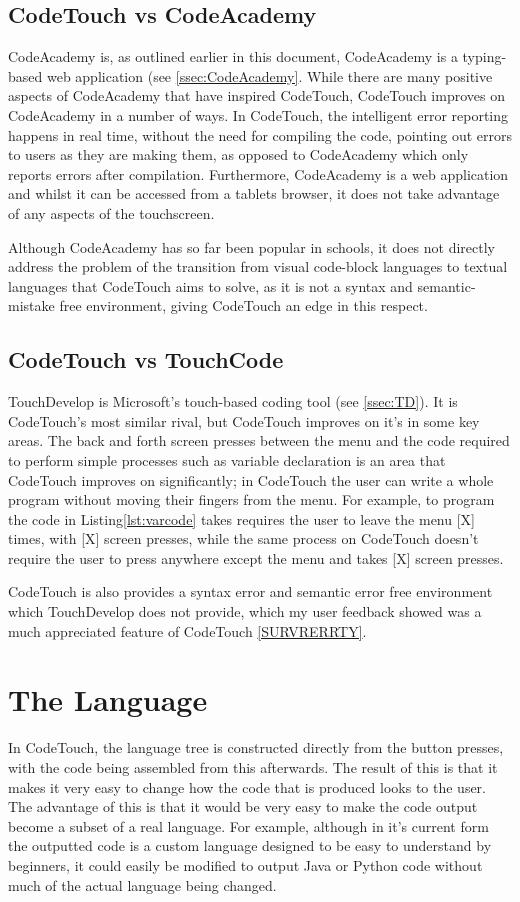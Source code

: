 \documentclass[ %
                    author={Jonathan Rankin},
                supervisor={Dr. David May, Dr. Ian Holyer},
                    degree={MEng},
                     title={CodeTouch},
                  subtitle={A Revolutionary Way To Program Real Code On Touch Screen Devices},
                      type={enterprise},
                      year={2015 } ]{dissertation}
\begin{document}
\begin{enumerate}
\subsection{CodeTouch vs CodeAcademy}

CodeAcademy is, as outlined earlier in this document, CodeAcademy is a typing-based web application (see \ref{ssec:CodeAcademy}. While there are many positive aspects of CodeAcademy that have inspired CodeTouch, CodeTouch improves on CodeAcademy in a number of ways. In CodeTouch, the intelligent error reporting happens in real time, without the need for compiling the code, pointing out errors to users as they are making them, as opposed to CodeAcademy which only reports errors after compilation. Furthermore, CodeAcademy is a web application and whilst it can be accessed from a tablets browser, it does not take advantage of any aspects of the touchscreen. 

Although CodeAcademy has so far been popular in schools, it does not directly address the problem of the transition from visual code-block languages to textual languages that CodeTouch aims to solve, as it is not a syntax and semantic-mistake free environment, giving CodeTouch an edge in this respect.


\subsection{CodeTouch vs TouchCode}
TouchDevelop is Microsoft's touch-based coding tool (see \ref{ssec:TD}). It is CodeTouch's most similar rival, but CodeTouch improves on it's in some key areas. The back and forth screen presses between the menu and the code required to perform simple processes such as variable declaration is an area that CodeTouch improves on significantly; in CodeTouch the user can write a whole program without moving their fingers from the menu. For example, to program the code in Listing\ref{lst:varcode} takes requires the user to leave the menu [X] times, with [X] screen presses, while the same process on CodeTouch doesn't require the user to press anywhere except the menu and takes [X] screen presses. 

CodeTouch is also provides a syntax error and semantic error free environment which TouchDevelop does not provide, which my user feedback showed was a much appreciated feature of CodeTouch \ref{SURVRERRTY}.

\section{The Language}
In CodeTouch, the language tree is constructed directly from the button presses, with the code being assembled from this afterwards. The result of this is that it makes it very easy to change how the code that is produced looks to the user. The advantage of this is that it would be very easy to make the code output become a subset of a real language. For example, although in it's current form the outputted code is a custom language designed to be easy to understand by beginners, it could easily be modified to output Java or Python code without much of the actual language being changed.


\end{enumerate}
\end{document}
